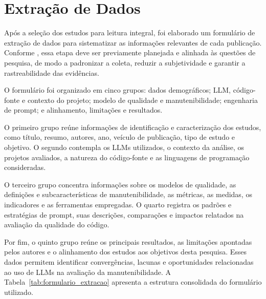 \section{Extração de Dados}

Após a seleção dos estudos para leitura integral, foi elaborado um formulário de extração de dados para sistematizar as informações relevantes de cada publicação. Conforme , essa etapa deve ser previamente planejada e alinhada às questões de pesquisa, de modo a padronizar a coleta, reduzir a subjetividade e garantir a rastreabilidade das evidências.

O formulário foi organizado em cinco grupos: dados demográficos; LLM, código-fonte e contexto do projeto; modelo de qualidade e manutenibilidade; engenharia de prompt; e alinhamento, limitações e resultados.

O primeiro grupo reúne informações de identificação e caracterização dos estudos, como título, resumo, autores, ano, veículo de publicação, tipo de estudo e objetivo. O segundo contempla os LLMs utilizados, o contexto da análise, os projetos avaliados, a natureza do código-fonte e as linguagens de programação consideradas.

O terceiro grupo concentra informações sobre os modelos de qualidade, as definições e subcaracterísticas de manutenibilidade, as métricas, as medidas, os indicadores e as ferramentas empregadas. O quarto registra os padrões e estratégias de prompt, suas descrições, comparações e impactos relatados na avaliação da qualidade do código.

Por fim, o quinto grupo reúne os principais resultados, as limitações apontadas pelos autores e o alinhamento dos estudos aos objetivos desta pesquisa. Esses dados permitem identificar convergências, lacunas e oportunidades relacionadas ao uso de LLMs na avaliação da manutenibilidade. A Tabela~\ref{tab:formulario_extracao} apresenta a estrutura consolidada do formulário utilizado.

